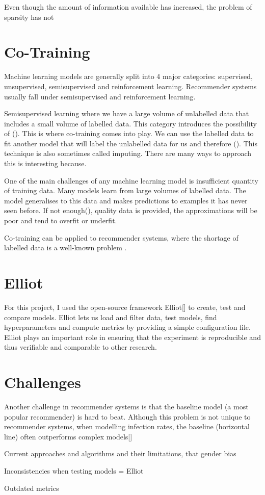 Even though the amount of information available has increased, the problem of sparsity has not


\section{Co-Training}
Machine learning models are generally split into 4 major categories: supervised, unsupervised, semisupervised and reinforcement learning. 
Recommender systems usually fall under semisupervised and reinforcement learning.

Semisupervised learning where we have a large volume of unlabelled data that includes a small volume of labelled data. This category introduces the possibility of (). This is where co-training comes into play. We can use the labelled data to fit another model that will label the unlabelled data for us and therefore (). This technique is also sometimes called imputing. There are many ways to approach this is interesting because.

One of the main challenges of any machine learning model is insufficient quantity of training data. Many models learn from large volumes of labelled data. The model generalises to this data and makes predictions to examples it has never seen before. If not enough(), quality data is provided, the approximations will be poor and tend to overfit or underfit.

Co-training can be applied to recommender systems, where the shortage of labelled data is a well-known problem \cite{corec}. 

\section{Elliot}
For this project, I used the open-source framework Elliot[] to create, test and compare models. Elliot lets us load and filter data, test models, find hyperparameters and compute metrics by providing a simple configuration file. Elliot plays an important role in ensuring that the experiment is reproducible and thus verifiable and comparable to other research.


\section{Challenges}
Another challenge in recommender systems is that the baseline model (a most popular recommender) is hard to beat. Although this problem is not unique to recommender systems, when modelling infection rates, the baseline (horizontal line) often outperforms complex models[]

Current approaches and algorithms and their limitations, that gender bias


Inconsistencies when testing models = Elliot

Outdated metrics







